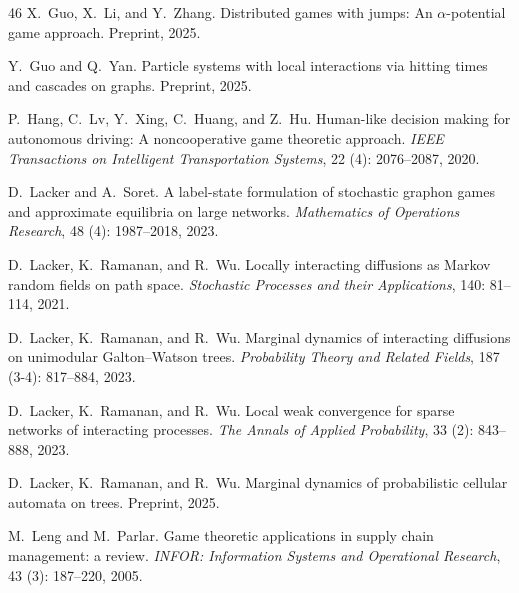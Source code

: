 \documentclass[11pt]{article}
\numberwithin{equation}{section}
\begin{document}
\begin{thebibliography}{46}
X.~Guo, X.~Li, and Y.~Zhang.
\newblock Distributed games with jumps: An $\alpha$-potential game approach.
\newblock Preprint, 2025{}.

Y.~Guo and Q.~Yan.
\newblock Particle systems with local interactions via hitting times and
  cascades on graphs.
\newblock Preprint, 2025.

P.~Hang, C.~Lv, Y.~Xing, C.~Huang, and Z.~Hu.
\newblock Human-like decision making for autonomous driving: A noncooperative
  game theoretic approach.
\newblock \emph{IEEE Transactions on Intelligent Transportation Systems},
  22 (4): 2076--2087, 2020.

D.~Lacker and A.~Soret.
\newblock A label-state formulation of stochastic graphon games and approximate
  equilibria on large networks.
\newblock \emph{Mathematics of Operations Research}, 48 (4):
  1987--2018, 2023.

D.~Lacker, K.~Ramanan, and R.~Wu.
\newblock Locally interacting diffusions as {M}arkov random fields on path
  space.
\newblock \emph{Stochastic Processes and their Applications}, 140:
  81--114, 2021.

D.~Lacker, K.~Ramanan, and R.~Wu.
\newblock Marginal dynamics of interacting diffusions on unimodular
  {Galton--Watson} trees.
\newblock \emph{Probability Theory and Related Fields}, 187
  (3-4): 817--884, 2023{}.

D.~Lacker, K.~Ramanan, and R.~Wu.
\newblock Local weak convergence for sparse networks of interacting processes.
\newblock \emph{The Annals of Applied Probability}, 33 (2):
  843--888, 2023{}.

D.~Lacker, K.~Ramanan, and R.~Wu.
\newblock Marginal dynamics of probabilistic cellular automata on trees.
\newblock Preprint, 2025.

M.~Leng and M.~Parlar.
\newblock Game theoretic applications in supply chain management: a review.
\newblock \emph{INFOR: Information Systems and Operational Research},
  43 (3): 187--220, 2005.


\end{thebibliography}
\end{document}
